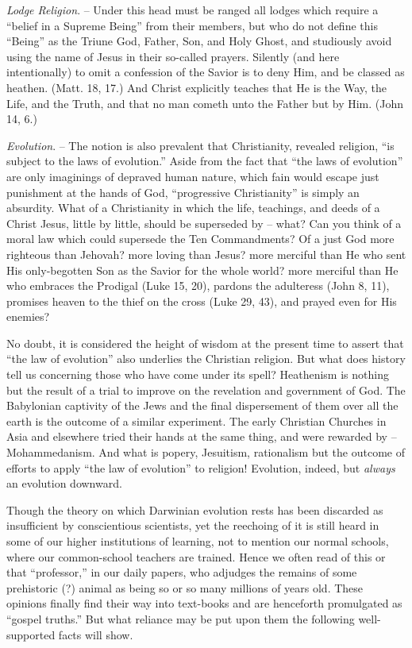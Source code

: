 \documentclass[
]{book}
\begin{document}
\emph{Lodge Religion}. -- Under this head must be ranged all lodges which require a ``belief in a Supreme Being'' from their members, but who do not define this ``Being'' as the Triune God, Father, Son, and Holy Ghost, and studiously avoid using the name of Jesus in their so-called prayers. Silently (and here intentionally) to omit a confession of the Savior is to deny Him, and be classed as heathen. (Matt. 18, 17.) And Christ explicitly teaches that He is the Way, the Life, and the Truth, and that no man cometh unto the Father but by Him. (John 14, 6.)

\emph{Evolution}. -- The notion is also prevalent that Christianity, revealed religion, ``is subject to the laws of evolution.'' Aside from the fact that ``the laws of evolution'' are only imaginings of depraved human nature, which fain would escape just punishment at the hands of God, ``progressive Christianity'' is simply an absurdity. What of a Christianity in which the life, teachings, and deeds of a Christ Jesus, little by little, should be superseded by -- what? Can you think of a moral law which could supersede the Ten Commandments? Of a just God more righteous than Jehovah? more loving than Jesus? more merciful than He who sent His only-begotten Son as the Savior for the whole world? more merciful than He who embraces the Prodigal (Luke 15, 20), pardons the adulteress (John 8, 11), promises heaven to the thief on the cross (Luke 29, 43), and prayed even for His enemies?

No doubt, it is considered the height of wisdom at the present time to assert that ``the law of evolution'' also underlies the Christian religion. But what does history tell us concerning those who have come under its spell? Heathenism is nothing but the result of a trial to improve on the revelation and government of God. The Babylonian captivity of the Jews and the final dispersement of them over all the earth is the outcome of a similar experiment. The early Christian Churches in Asia and elsewhere tried their hands at the same thing, and were rewarded by -- Mohammedanism. And what is popery, Jesuitism, rationalism but the outcome of efforts to apply ``the law of evolution'' to religion! Evolution, indeed, but \emph{always} an evolution downward.

Though the theory on which Darwinian evolution rests has been discarded as insufficient by conscientious scientists, yet the reechoing of it is still heard in some of our higher institutions of learning, not to mention our normal schools, where our common-school teachers are trained. Hence we often read of this or that ``professor,'' in our daily papers, who adjudges the remains of some prehistoric (?) animal as being so or so many millions of years old. These opinions finally find their way into text-books and are henceforth promulgated as ``gospel truths.'' But what reliance may be put upon them the following well-supported facts will show.
\end{document}
